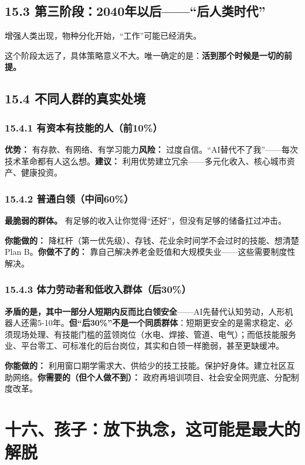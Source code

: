 \documentclass[11pt,a4paper]{ctexart}
\begin{document}
\subsection{15.3 第三阶段：2040年以后——“后人类时代”}

增强人类出现，物种分化开始，“工作”可能已经消失。

这个阶段太远了，具体策略意义不大。唯一确定的是：\textbf{活到那个时候是一切的前提。}

\subsection{15.4 不同人群的真实处境}

\subsubsection{15.4.1 有资本有技能的人（前10\%）}

\textbf{优势：} 有存款、有网络、有学习能力\textbf{风险：} 过度自信。“AI替代不了我”——每次技术革命都有人这么想。\textbf{建议：} 利用优势建立冗余——多元化收入、核心城市资产、健康投资。

\subsubsection{15.4.2 普通白领（中间60\%）}

\textbf{最脆弱的群体。} 有足够的收入让你觉得“还好”，但没有足够的储备扛过冲击。

\textbf{你能做的：} 降杠杆（第一优先级）、存钱、花业余时间学不会过时的技能、想清楚Plan B。\textbf{你做不了的：} 靠自己解决养老金贬值和大规模失业——这些需要制度性解决。

\subsubsection{15.4.3 体力劳动者和低收入群体（后30\%）}

\textbf{矛盾的是，其中一部分人短期内反而比白领安全}——AI先替代认知劳动，人形机器人还需5-10年。\textbf{但“后30\%”不是一个同质群体}：短期更安全的是需求稳定、必须现场处理、有技能门槛的蓝领岗位（水电、焊接、管道、电气）；而低技能服务业、平台零工、可标准化的后台岗位，其实和白领一样脆弱，甚至更缺缓冲。

\textbf{你能做的：} 利用窗口期学需求大、供给少的技工技能。保护好身体。建立社区互助网络。\textbf{你需要的（但个人做不到）：} 政府再培训项目、社会安全网兜底、分配制度改革。

\section{十六、孩子：放下执念，这可能是最大的解脱}
\end{document}
